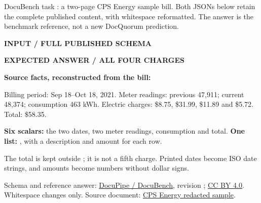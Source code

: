 \begin{landscape}
\label{demo:electric}
\thispagestyle{empty}
DocuBench task : a two-page CPS Energy sample bill. Both JSONs below retain the complete published content, with whitespace reformatted. The answer is the benchmark reference, not a new DocQuorum prediction.

\begin{minipage}[t]{.55\linewidth}
{\color{teal}\bfseries INPUT / FULL PUBLISHED SCHEMA}\par

\end{minipage}\hfill
\begin{minipage}[t]{.41\linewidth}
{\color{teal}\bfseries EXPECTED ANSWER / ALL FOUR CHARGES}\par

\textbf{Source facts, reconstructed from the bill:}\par
Billing period: Sep 18--Oct 18, 2021. Meter readings: previous 47,911; current 48,374; consumption 463 kWh. Electric charges: \$8.75, \$31.99, \$11.89 and \$5.72. Total: \$58.35.

\textbf{Six scalars:} the two dates, two meter readings, consumption and total. \textbf{One list:} , with a description and amount for each row.

The total is kept outside ; it is not a fifth charge. Printed dates become ISO date strings, and amounts become numbers without dollar signs.
\end{minipage}

{\footnotesize\color{ink!75}Schema and reference answer: \href{https://github.com/DocuPipe/DocuBench/tree/43a3f3bc00e591e711075678ca6d154acfedcf42}{DocuPipe / DocuBench}, revision ; \href{https://creativecommons.org/licenses/by/4.0/}{CC BY 4.0}. Whitespace changes only. Source document: \href{https://www.cpsenergy.com/content/dam/corporate/en/Documents/RAC/CustomerBills/Bill\%20Sample\%20-\%20RA\%20Rate\%20-\%20Non-Summer\%20\%20Redacted.pdf}{CPS Energy redacted sample}.}
\end{landscape}
